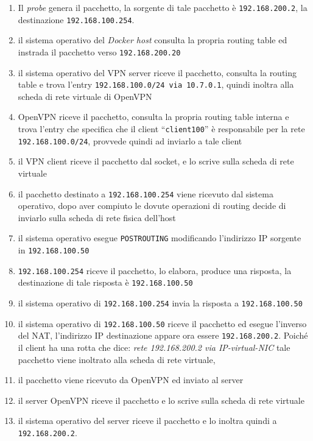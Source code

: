 \begin{enumerate}
  \item Il \textit{probe} genera il pacchetto, la sorgente di tale pacchetto è
  \texttt{192.168.200.2}, la destinazione \texttt{192.168.100.254}.
  \item il sistema operativo del \textit{Docker host} consulta la propria routing table
  ed instrada il pacchetto verso \texttt{192.168.200.20}
  \item il sistema operativo del VPN server riceve il pacchetto, consulta la
  routing table e trova l'entry \texttt{192.168.100.0/24 via 10.7.0.1}, quindi inoltra
  alla scheda di rete virtuale di OpenVPN
  \item OpenVPN riceve il pacchetto, consulta la propria routing table interna e
  trova l'entry che specifica che il client ``\texttt{client100}'' è responsabile per
  la rete \texttt{192.168.100.0/24}, provvede quindi ad inviarlo a tale client
  \item il VPN client riceve il pacchetto dal socket, e lo scrive sulla scheda di rete
  virtuale
  \item il pacchetto destinato a \texttt{192.168.100.254} viene ricevuto dal sistema
  operativo, dopo aver compiuto le dovute operazioni di routing decide di inviarlo
  sulla scheda di rete fisica dell'host
  \item il sistema operativo esegue \texttt{POSTROUTING} modificando l'indirizzo IP
  sorgente in \texttt{192.168.100.50}
  \item \texttt{192.168.100.254} riceve il pacchetto, lo elabora, produce una risposta,
  la destinazione di tale risposta è \texttt{192.168.100.50}
  \item il sistema operativo di \texttt{192.168.100.254} invia la risposta a
  \texttt{192.168.100.50}
  \item il sistema operativo di \texttt{192.168.100.50} riceve il pacchetto ed
  esegue l'inverso del NAT, l'indirizzo IP destinazione appare ora essere \texttt{192.168.200.2}.
  Poiché il client ha una rotta che dice: \textit{rete 192.168.200.2 via IP-virtual-NIC}
  tale pacchetto viene inoltrato alla scheda di rete virtuale,
  \item il pacchetto viene ricevuto da OpenVPN ed inviato al server
  \item il server OpenVPN riceve il pacchetto e lo scrive sulla scheda di rete virtuale
  \item il sistema operativo del server riceve il pacchetto e lo inoltra quindi a
  \texttt{192.168.200.2}.
\end{enumerate}


